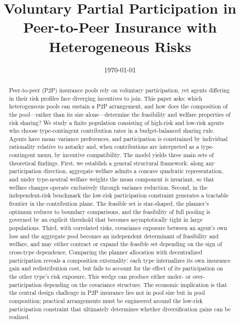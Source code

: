 \documentclass[a4paper,12pt]{article}
\title{Voluntary Partial Participation in Peer-to-Peer Insurance with Heterogeneous Risks}
\date{\today}
\theoremstyle{definition}
\theoremstyle{remark}
\newcommand{\1}{\mathbf{1}}
\begin{document}
\maketitle

\begin{abstract}
Peer-to-peer (P2P) insurance pools rely on voluntary participation, yet agents differing in their risk profiles face diverging incentives to join. This paper asks: which heterogeneous pools can sustain a P2P arrangement, and how does the composition of the pool---rather than its size alone---determine the feasibility and welfare properties of risk sharing? We study a finite population consisting of high-risk and low-risk agents who choose type-contingent contribution rates in a budget-balanced sharing rule. Agents have mean--variance preferences, and participation is constrained by individual rationality relative to autarky and, when contributions are interpreted as a type-contingent menu, by incentive compatibility. The model yields three main sets of theoretical findings. First, we establish a general structural framework: along any participation direction, aggregate welfare admits a concave quadratic representation, and under type-neutral welfare weights the mean component is invariant, so that welfare changes operate exclusively through variance reduction. Second, in the independent-risk benchmark the low-risk participation constraint generates a tractable frontier in the contribution plane. The feasible set is star-shaped, the planner's optimum reduces to boundary comparisons, and the feasibility of full pooling is governed by an explicit threshold that becomes asymptotically tight in large populations. Third, with correlated risks, covariance exposure between an agent's own loss and the aggregate pool becomes an independent determinant of feasibility and welfare, and may either contract or expand the feasible set depending on the sign of cross-type dependence. Comparing the planner allocation with decentralized participation reveals a composition externality: each type internalizes its own insurance gain and redistribution cost, but fails to account for the effect of its participation on the other type's risk exposure. This wedge can produce either under- or over-participation depending on the covariance structure. The economic implication is that the central design challenge in P2P insurance lies not in pool size but in pool composition; practical arrangements must be engineered around the low-risk participation constraint that ultimately determines whether diversification gains can be realized.
\end{abstract}
\end{document}
